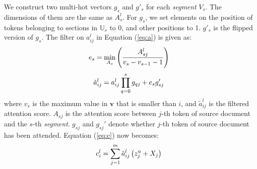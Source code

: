 We construct two multi-hot vectors $g_{s}$ and $g'_{s}$ for each \textit{segment} $V_{s}$.
The dimensions of them are the
same as $A_{s}^{l}$. For $g_{s}$, we set elements on the position of tokens
belonging to sections in $\mathbb{U}_{s}$ to 0, and other
positions to 1. $g'_{s}$ is the flipped version of $g_{s}$. 
The filter on $a_{ij}^{l}$ in Equation (\ref{eq:a}) is given as:
\begin{equation}
\small
    e_{s} = \min \limits_{A_{s}}\left(\frac{A_{sj}^{l}}{v_{s}-v_{s-1}-1}\right)
\end{equation}
\begin{equation}
\small
    \tilde{a}_{ij}^{l} = a_{ij}^{l}\prod_{q=0}^{s}g_{qj} + e_{s}g_{sj}'
\end{equation}
where $v_{s}$ is the maximum value in 
$\mathbf{v}$ that is smaller than $i$, and $\tilde{a}_{ij}^l$ is the filtered
attention score. $A_{sj}$ is the attention score between $j$-th token
of source document and the $s$-th \textit{segment}. 
$g_{sj}$ and $g_{sj}'$ denote whether $j$-th token
of source document has been attended.
Equation (\ref{eq:c}) now becomes:
\begin{equation}
\small
    c _ { i } ^ { l } = \sum _ { j = 1 } ^ { m } \tilde{a}_{ij}^{l} \left( z _ { j } ^ { u } + X_j \right)
\end{equation}



